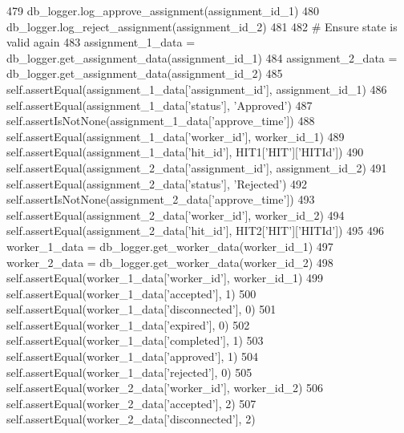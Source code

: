 \begin{DoxyCode}
479         db\_logger.log\_approve\_assignment(assignment\_id\_1)
480         db\_logger.log\_reject\_assignment(assignment\_id\_2)
481 
482         \textcolor{comment}{# Ensure state is valid again}
483         assignment\_1\_data = db\_logger.get\_assignment\_data(assignment\_id\_1)
484         assignment\_2\_data = db\_logger.get\_assignment\_data(assignment\_id\_2)
485         self.assertEqual(assignment\_1\_data[\textcolor{stringliteral}{'assignment\_id'}], assignment\_id\_1)
486         self.assertEqual(assignment\_1\_data[\textcolor{stringliteral}{'status'}], \textcolor{stringliteral}{'Approved'})
487         self.assertIsNotNone(assignment\_1\_data[\textcolor{stringliteral}{'approve\_time'}])
488         self.assertEqual(assignment\_1\_data[\textcolor{stringliteral}{'worker\_id'}], worker\_id\_1)
489         self.assertEqual(assignment\_1\_data[\textcolor{stringliteral}{'hit\_id'}], HIT1[\textcolor{stringliteral}{'HIT'}][\textcolor{stringliteral}{'HITId'}])
490         self.assertEqual(assignment\_2\_data[\textcolor{stringliteral}{'assignment\_id'}], assignment\_id\_2)
491         self.assertEqual(assignment\_2\_data[\textcolor{stringliteral}{'status'}], \textcolor{stringliteral}{'Rejected'})
492         self.assertIsNotNone(assignment\_2\_data[\textcolor{stringliteral}{'approve\_time'}])
493         self.assertEqual(assignment\_2\_data[\textcolor{stringliteral}{'worker\_id'}], worker\_id\_2)
494         self.assertEqual(assignment\_2\_data[\textcolor{stringliteral}{'hit\_id'}], HIT2[\textcolor{stringliteral}{'HIT'}][\textcolor{stringliteral}{'HITId'}])
495 
496         worker\_1\_data = db\_logger.get\_worker\_data(worker\_id\_1)
497         worker\_2\_data = db\_logger.get\_worker\_data(worker\_id\_2)
498         self.assertEqual(worker\_1\_data[\textcolor{stringliteral}{'worker\_id'}], worker\_id\_1)
499         self.assertEqual(worker\_1\_data[\textcolor{stringliteral}{'accepted'}], 1)
500         self.assertEqual(worker\_1\_data[\textcolor{stringliteral}{'disconnected'}], 0)
501         self.assertEqual(worker\_1\_data[\textcolor{stringliteral}{'expired'}], 0)
502         self.assertEqual(worker\_1\_data[\textcolor{stringliteral}{'completed'}], 1)
503         self.assertEqual(worker\_1\_data[\textcolor{stringliteral}{'approved'}], 1)
504         self.assertEqual(worker\_1\_data[\textcolor{stringliteral}{'rejected'}], 0)
505         self.assertEqual(worker\_2\_data[\textcolor{stringliteral}{'worker\_id'}], worker\_id\_2)
506         self.assertEqual(worker\_2\_data[\textcolor{stringliteral}{'accepted'}], 2)
507         self.assertEqual(worker\_2\_data[\textcolor{stringliteral}{'disconnected'}], 2)

\end{DoxyCode}
